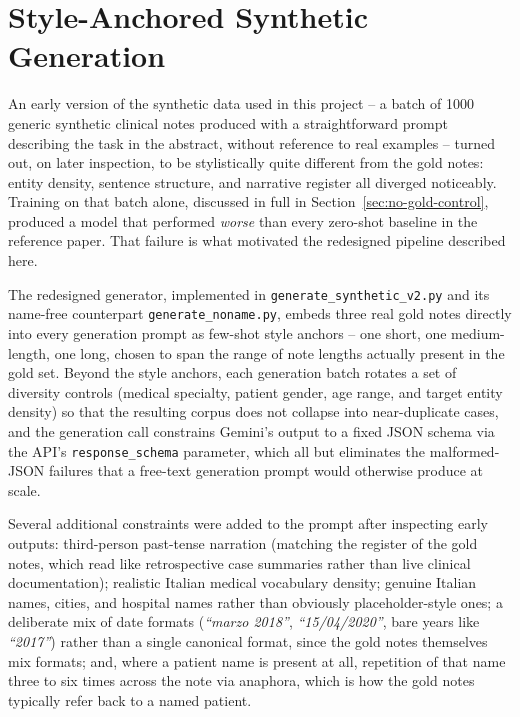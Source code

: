 \documentclass[12pt,a4paper]{report}
\begin{document}
\section{Style-Anchored Synthetic Generation}
\label{sec:style-anchoring}

An early version of the synthetic data used in this project -- a batch of 1000 generic synthetic clinical notes produced with a straightforward prompt describing the task in the abstract, without reference to real examples -- turned out, on later inspection, to be stylistically quite different from the gold notes: entity density, sentence structure, and narrative register all diverged noticeably. Training on that batch alone, discussed in full in Section~\ref{sec:no-gold-control}, produced a model that performed \emph{worse} than every zero-shot baseline in the reference paper. That failure is what motivated the redesigned pipeline described here.

The redesigned generator, implemented in \texttt{generate\_synthetic\_v2.py} and its name-free counterpart \texttt{generate\_noname.py}, embeds three real gold notes directly into every generation prompt as few-shot style anchors -- one short, one medium-length, one long, chosen to span the range of note lengths actually present in the gold set. Beyond the style anchors, each generation batch rotates a set of diversity controls (medical specialty, patient gender, age range, and target entity density) so that the resulting corpus does not collapse into near-duplicate cases, and the generation call constrains Gemini's output to a fixed JSON schema via the API's \texttt{response\_schema} parameter, which all but eliminates the malformed-JSON failures that a free-text generation prompt would otherwise produce at scale.

Several additional constraints were added to the prompt after inspecting early outputs: third-person past-tense narration (matching the register of the gold notes, which read like retrospective case summaries rather than live clinical documentation); realistic Italian medical vocabulary density; genuine Italian names, cities, and hospital names rather than obviously placeholder-style ones; a deliberate mix of date formats (\emph{``marzo 2018''}, \emph{``15/04/2020''}, bare years like \emph{``2017''}) rather than a single canonical format, since the gold notes themselves mix formats; and, where a patient name is present at all, repetition of that name three to six times across the note via anaphora, which is how the gold notes typically refer back to a named patient.
\end{document}
